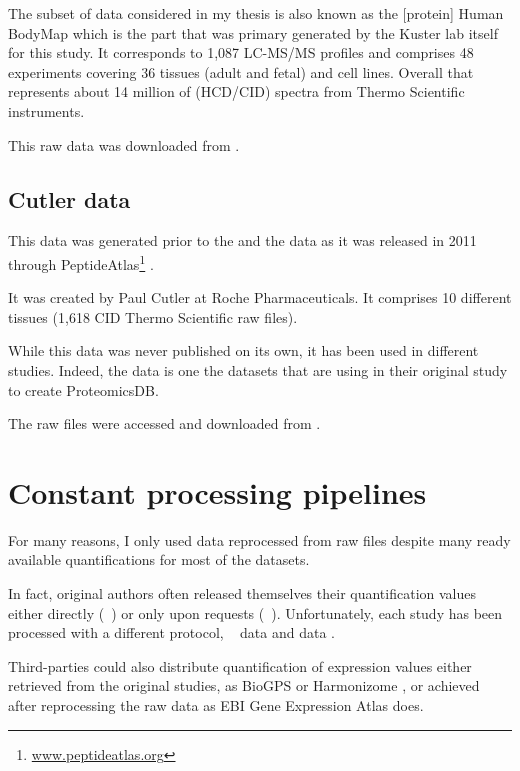 The subset of data considered in my thesis is also
known as the [protein] Human BodyMap which is the part that was primary generated
by the Kuster lab itself for this study. It corresponds to 1,087 \gls{LC-MS/MS}
profiles and comprises 48 experiments covering 36 tissues (adult and fetal) and
cell lines. Overall that represents about 14 million of (\gls{HCD}/\gls{CID})
spectra from Thermo Scientific instruments.

This raw data was downloaded from .

\subsection{Cutler data}
\begin{comment}
    rexpliquer quelle partie reutilisée
\end{comment}

This data was generated prior to the  and the 
data as it was released in 2011 through PeptideAtlas\footnote{%
\href{http://www.peptideatlas.org/}{www.peptideatlas.org}}
\citep{PeptideAtlas}.

It was created by Paul Cutler at Roche Pharmaceuticals.
It comprises 10 different tissues (1,618 \gls{CID} Thermo Scientific raw files).

While this data was never published on its own, it has been used in different
studies. Indeed, the  data is one the datasets that
\cite{KusterData} are using in their original study to create ProteomicsDB.

The raw files were accessed and downloaded from .

\section{Constant processing pipelines}

For many reasons, I only used data reprocessed from raw files despite many
ready available quantifications for most of the datasets.

In fact, original authors often released themselves their quantification values
either directly (\eg\ \cite{Krupp2012})
or only upon requests (\eg\ \cite{PandeyData}). Unfortunately, each study has
been processed with a different protocol, \eg\ \dataset{\Gtex}
data \citep{GTExTranscript} and  data \citep{Krupp2012}.

Third-parties could also distribute quantification of expression values either
retrieved from the original studies, as BioGPS \citep{BioGPS1} or
Harmonizome \citep{Harmonizome}, or achieved after reprocessing the raw data
as EBI Gene Expression Atlas \citep{EBIgxa} does.

